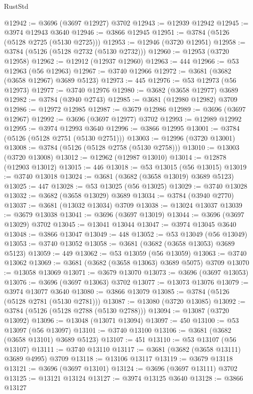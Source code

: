 \begin{lexlean}{RustStd}
\begin{coremodule}
@12942 := @3696 (@3697 @12927) @3702
@12943 := @12939 @12942
@12945 := @3974 @12943 @3640
@12946 := @3866 @12945
@12951 := @3784 (@5126 (@5128 @2725 (@5130 @2725)))
@12953 := @12946 (@3720 @12951)
@12958 := @3784 (@5126 (@5128 @2732 (@5130 @2732)))
@12960 := @12953 (@3720 @12958)
@12962 := @12912 (@12937 @12960)
@12963 := 444
@12966 := @53 @12963 (@56 @12963)
@12967 := @3740 @12966
@12972 := @3681 (@3682 (@3658 @12967) @3689 @5123)
@12973 := 445
@12976 := @53 @12973 (@56 @12973)
@12977 := @3740 @12976
@12980 := @3682 (@3658 @12977) @3689
@12982 := @3784 (@3940 @2743)
@12985 := @3681 (@12980 @12982) @3709
@12986 := @12972 @12985
@12987 := @3679 @12986
@12989 := @3696 (@3697 @12967)
@12992 := @3696 (@3697 @12977) @3702
@12993 := @12989 @12992
@12995 := @3974 @12993 @3640
@12996 := @3866 @12995
@13001 := @3784 (@5126 (@5128 @2751 (@5130 @2751)))
@13003 := @12996 (@3720 @13001)
@13008 := @3784 (@5126 (@5128 @2758 (@5130 @2758)))
@13010 := @13003 (@3720 @13008)
@13012 := @12962 (@12987 @13010)
@13014 := @12878 (@12903 @13012)
@13015 := 446
@13018 := @53 @13015 (@56 @13015)
@13019 := @3740 @13018
@13024 := @3681 (@3682 (@3658 @13019) @3689 @5123)
@13025 := 447
@13028 := @53 @13025 (@56 @13025)
@13029 := @3740 @13028
@13032 := @3682 (@3658 @13029) @3689
@13034 := @3784 (@3940 @2770)
@13037 := @3681 (@13032 @13034) @3709
@13038 := @13024 @13037
@13039 := @3679 @13038
@13041 := @3696 (@3697 @13019)
@13044 := @3696 (@3697 @13029) @3702
@13045 := @13041 @13044
@13047 := @3974 @13045 @3640
@13048 := @3866 @13047
@13049 := 448
@13052 := @53 @13049 (@56 @13049)
@13053 := @3740 @13052
@13058 := @3681 (@3682 (@3658 @13053) @3689 @5123)
@13059 := 449
@13062 := @53 @13059 (@56 @13059)
@13063 := @3740 @13062
@13069 := @3681 (@3682 (@3658 @13063) @3689 @5075) @3709
@13070 := @13058 @13069
@13071 := @3679 @13070
@13073 := @3696 (@3697 @13053)
@13076 := @3696 (@3697 @13063) @3702
@13077 := @13073 @13076
@13079 := @3974 @13077 @3640
@13080 := @3866 @13079
@13085 := @3784 (@5126 (@5128 @2781 (@5130 @2781)))
@13087 := @13080 (@3720 @13085)
@13092 := @3784 (@5126 (@5128 @2788 (@5130 @2788)))
@13094 := @13087 (@3720 @13092)
@13096 := @13048 (@13071 @13094)
@13097 := 450
@13100 := @53 @13097 (@56 @13097)
@13101 := @3740 @13100
@13106 := @3681 (@3682 (@3658 @13101) @3689 @5123)
@13107 := 451
@13110 := @53 @13107 (@56 @13107)
@13111 := @3740 @13110
@13117 := @3681 (@3682 (@3658 @13111) @3689 @4995) @3709
@13118 := @13106 @13117
@13119 := @3679 @13118
@13121 := @3696 (@3697 @13101)
@13124 := @3696 (@3697 @13111) @3702
@13125 := @13121 @13124
@13127 := @3974 @13125 @3640
@13128 := @3866 @13127

\end{coremodule}
\end{lexlean}

